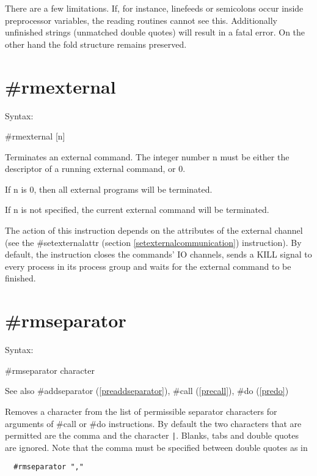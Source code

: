 There are a few limitations. If, for instance, linefeeds or semicolons 
occur inside preprocessor variables, the reading routines cannot see this. 
Additionally unfinished strings (unmatched double quotes) will result in 
a fatal error. On the other hand the fold structure remains preserved.


\section{\#rmexternal}
\label{prermexternal}

\noindent Syntax:

\#rmexternal [n]

\noindent Terminates an external command. The integer 
number n must be either the descriptor of a running external command, or 0.

If n is 0, then all external programs will be terminated.

If n is not specified, the current external command will be terminated.

The action of this instruction depends on the attributes of the external 
channel (see the \#setexternalattr (section 
\ref{setexternalcommunication}) instruction). By default, the instruction 
closes the commands' IO channels, sends a KILL signal to 
every process in its process group and waits for the external command to be 
finished.

 
\section{\#rmseparator}
\label{prermseparator}

\noindent Syntax:

\#rmseparator character
 
\noindent See also \#addseparator (\ref{preaddseparator}),
            \#call (\ref{precall}), \#do (\ref{predo})

\noindent Removes a character from the list of permissible 
separator characters for arguments of \#call or \#do instructions. By 
default the two characters that are permitted are the comma and the 
character \verb:|:. Blanks, tabs and double quotes are ignored. Note that 
the comma must be specified between double quotes as in
\begin{verbatim}
  #rmseparator ","
\end{verbatim}

